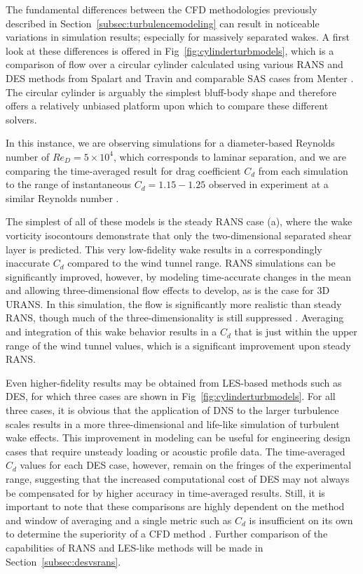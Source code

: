 \documentclass[journal]{new-aiaa}
\begin{document}
The fundamental differences between the CFD methodologies previously described in Section~\ref{subsec:turbulencemodeling} can result in noticeable variations in simulation results; especially for massively separated wakes. A first look at these differences is offered in Fig~\ref{fig:cylinderturbmodels}, which is a comparison of flow over a circular cylinder calculated using various RANS and DES methods from Spalart and Travin \cite{spalart2009detachededdy} and comparable SAS cases from Menter \cite{menter2005scaleadaptive}. The circular cylinder is arguably the simplest bluff-body shape and therefore offers a relatively unbiased platform upon which to compare these different solvers.

In this instance, we are observing simulations for a diameter-based Reynolds number of $Re_D = 5 \times 10^4$, which corresponds to laminar separation, and we are comparing the time-averaged result for drag coefficient $C_d$ from each simulation to the range of instantaneous $C_d=1.15-1.25$ observed in experiment at a similar Reynolds number \cite{travin2000detachededdy}.

The simplest of all of these models is the steady RANS case (a), where the wake vorticity isocontours demonstrate that only the two-dimensional separated shear layer is predicted. This very low-fidelity wake results in a correspondingly inaccurate $C_d$ compared to the wind tunnel range. RANS simulations can be significantly improved, however, by modeling time-accurate changes in the mean and allowing three-dimensional flow effects to develop, as is the case for 3D URANS.  In this simulation, the flow is significantly more realistic than steady RANS, though much of the three-dimensionality is still suppressed \cite{spalart2009detachededdy}.  Averaging and integration of this wake behavior results in a $C_d$ that is just within the upper range of the wind tunnel values, which is a significant improvement upon steady RANS.

Even higher-fidelity results may be obtained from LES-based methods such as DES, for which three cases are shown in Fig~\ref{fig:cylinderturbmodels}. For all three cases, it is obvious that the application of DNS to the larger turbulence scales results in a more three-dimensional and life-like simulation of turbulent wake effects. This improvement in modeling can be useful for engineering design cases that require unsteady loading or acoustic profile data. The time-averaged $C_d$ values for each DES case, however, remain on the fringes of the experimental range, suggesting that the increased computational cost of DES may not always be compensated for by higher accuracy in time-averaged results. Still, it is important to note that these comparisons are highly dependent on the method and window of averaging and a single metric such as $C_d$ is insufficient on its own to determine the superiority of a CFD method \cite{travin2000detachededdy}. Further comparison of the capabilities of RANS and LES-like methods will be made in Section~\ref{subsec:desvsrans}.
\end{document}

